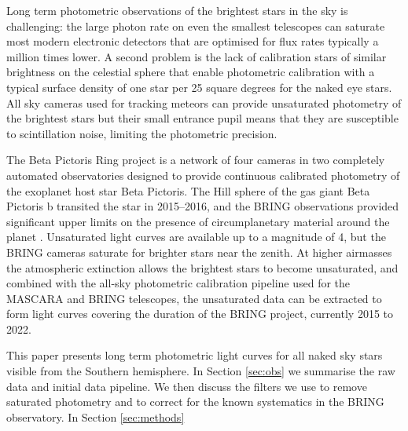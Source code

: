 \documentclass{aa}
\begin{document}
Long term photometric observations of the brightest stars in the sky is challenging: the large photon rate on even the smallest telescopes can saturate most modern electronic detectors that are optimised for flux rates typically a million times lower.
%
A second problem is the lack of calibration stars of similar brightness on the celestial sphere that enable photometric calibration with a typical surface density of one star per 25 square degrees for the naked eye stars.
%
All sky cameras used for tracking meteors can provide unsaturated photometry of the brightest stars but their small entrance pupil means that they are susceptible to scintillation noise, limiting the photometric precision.

The Beta Pictoris Ring \citep[BRING; ][]{Stuik_2014} project is a network of four cameras in two completely automated observatories designed to provide continuous calibrated photometry of the exoplanet host star Beta Pictoris.
%
The Hill sphere of the gas giant Beta Pictoris b transited the star in 2015--2016, and the BRING observations provided significant upper limits on the presence of circumplanetary material around the planet \citep{Kenworthy21}.
%
Unsaturated light curves are available up to a magnitude of 4, but the BRING cameras saturate for brighter stars near the zenith.
%
At higher airmasses the atmospheric extinction allows the brightest stars to become unsaturated, and combined with the all-sky photometric calibration pipeline used for the MASCARA and BRING telescopes, the unsaturated data can be extracted to form light curves covering the duration of the BRING project, currently 2015 to 2022.

This paper presents long term photometric light curves for all naked sky stars visible from the Southern hemisphere.
%
In Section \ref{sec:obs} we summarise the raw data and initial data pipeline.
%
We then discuss the filters we use to remove saturated photometry and to correct for the known systematics in the BRING observatory.
%
In Section \ref{sec:methods}

\end{document}
